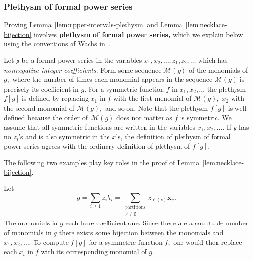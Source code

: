 \documentclass[ALCO, Unicode]{cedram}
\begin{document}
\subsubsection{Plethysm of formal power series}\label{def:plethysm-formal-power-series}
    
Proving Lemma~\ref{lem:upper-intervals-plethysm} and Lemma~\ref{lem:necklace-bijection} involves \textbf{plethysm of formal power series,} which we explain below using the conventions of Wachs in~\cite[\S 2.4]{WachsPosetTopology}.

Let $g$ be a formal power series in the variables $x_1, x_2, \ldots, z_1, z_2, \ldots $ which has \textit{nonnegative integer coefficients}. Form some sequence \textbf{$\mathcal{M}(g)$} of the monomials of $g,$ where the number of times each monomial appears in the sequence $\mathcal{M}(g)$ is precisely its coefficient in $g.$  For a symmetric function $f$ in $x_1, x_2, \ldots $ the plethysm \textbf{$f[g]$} is defined by replacing $x_1$ in $f$ with the first monomial of $\mathcal{M}(g),$ $x_2$ with the second monomial of $\mathcal{M}(g),$ and so on. Note that the plethysm $f[g]$ is well-defined because the order of~$\mathcal{M}(g)$ does not matter as $f$ is symmetric.  We assume that all symmetric functions are written in the variables $x_1, x_2, \ldots. $ If $g$ has no $z_i$'s and is also symmetric in the $x$'s, the definition of plethysm of formal power series agrees with the ordinary definition of plethysm of $f[g].$

The following two examples play key roles in the proof of Lemma~\ref{lem:necklace-bijection}.

\begin{exam}\label{ex:total-ordering-hi-sum}
    Let \[\displaystyle g = \sum_{i \geq 1}z_ih_i = \sum_{\substack{\text{partitions}\\ \nu \neq \emptyset}}z_{\ell(\nu)}\mathbf{x}_{\nu}.\] The monomials in $g$ each have coefficient one.  Since there are a countable number of monomials in $g$ there exists some bijection between the monomials and $x_1, x_2, \ldots.$ To compute $f[g]$ for a symmetric function $f,$ one would then replace each $x_i$ in $f$ with its corresponding monomial of $g.$
\end{exam}
\end{document}
